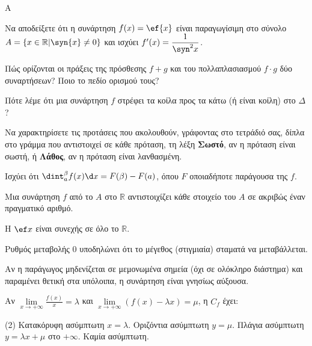 \begin{thema}{A}
\begin{erwthma}
    \item Να αποδείξετε ότι η συνάρτηση $ f(x)=\ef{x} $ είναι παραγωγίσιμη στο σύνολο $ A=\{x\in\mathbb{R}|\syn{x}\neq 0\} $ και ισχύει $ f'(x)=\dfrac{1}{\syn^2{x}} $.
    \item Πώς ορίζονται οι πράξεις της πρόσθεσης $f+g$ και του πολλαπλασιασμού $f \cdot g$ δύο συναρτήσεων? Ποιο το πεδίο ορισμού τους?
    \item Πότε λέμε ότι μια συνάρτηση $f$ στρέφει τα κοίλα προς τα κάτω (ή είναι κοίλη) στο $\Delta$?
    \item Να χαρακτηρίσετε τις προτάσεις που ακολουθούν, γράφοντας στο τετράδιό σας, δίπλα στο γράμμα που αντιστοιχεί σε κάθε πρόταση, τη λέξη \textbf{Σωστό}, αν η πρόταση είναι σωστή, ή \textbf{Λάθος}, αν η πρόταση είναι λανθασμένη.
    \begin{alist}
        \item Ισχύει ότι $\dint_a^\beta f(x) \d x = F(\beta) - F(a)$, όπου $F$ οποιαδήποτε παράγουσα της $f$.
        \item Μια συνάρτηση $f$ από το $A$ στο $\mathbb{R}$ αντιστοιχίζει κάθε στοιχείο του $A$ σε ακριβώς έναν πραγματικό αριθμό.
        \item H $\ef x$ είναι συνεχής σε όλο το $\mathbb{R}$.
        \item Ρυθμός μεταβολής 0 υποδηλώνει ότι το μέγεθος (στιγμιαία) σταματά να μεταβάλλεται.
        \item Αν η παράγωγος μηδενίζεται σε μεμονωμένα σημεία (όχι σε ολόκληρο διάστημα) και παραμένει θετική στα υπόλοιπα, η συνάρτηση είναι γνησίως αύξουσα.
    \end{alist}
    \item Αν $\lim\limits_{x\to +\infty} \frac{f(x)}{x} = \lambda$ και $\lim\limits_{x\to +\infty} (f(x) - \lambda x) = \mu$, η $C_f$ έχει:
    \begin{tasks}[label=\let\textdexiakeraia\relax\alph*.](2)
        \task Κατακόρυφη ασύμπτωτη $x = \lambda$.
        \task Οριζόντια ασύμπτωτη $y = \mu$.
        \task Πλάγια ασύμπτωτη $y = \lambda x + \mu$ στο $+\infty$.
        \task Καμία ασύμπτωτη.
    \end{tasks}
\end{erwthma}
\end{thema}


